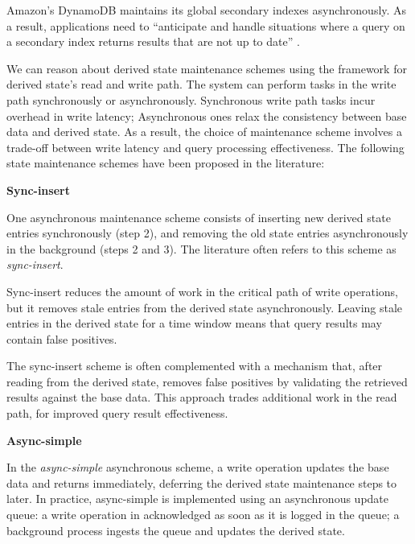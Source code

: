 Amazon's DynamoDB maintains its global secondary indexes asynchronously.
As a result, applications need to ``anticipate and handle situations where a query on a secondary index returns results that are
not up to date'' \cite{dynamodb:async}.

We can reason about derived state maintenance schemes using the framework for derived state's read and write path.
The system can perform tasks in the write path synchronously or asynchronously.
Synchronous write path tasks incur overhead in write latency;
Asynchronous ones relax the consistency between base data and derived state.
As a result, the choice of maintenance scheme involves a trade-off between write latency and query processing effectiveness.
The following state maintenance schemes have been proposed in the literature:





\bigskip
\noindent
\textbf{Sync-insert}

\noindent
One asynchronous maintenance scheme consists of inserting new derived state entries synchronously (step 2),
and removing the old state entries asynchronously in the background (steps 2 and 3).
The literature often refers to this scheme as \textit{sync-insert}.

Sync-insert reduces the amount of work in the critical path of write operations,
but it removes stale entries from the derived state asynchronously.
Leaving stale entries in the derived state for a time window means that query results may contain false positives.

The sync-insert scheme is often complemented with a mechanism that,
after reading from the derived state, removes false positives by validating the retrieved results against
the base data.
This approach trades additional work in the read path, for improved query result effectiveness.

\bigskip
\noindent
\textbf{Async-simple}

\noindent
In the \textit{async-simple} asynchronous scheme,
a write operation updates the base data and returns immediately,
deferring the derived state maintenance steps to later.
In practice, async-simple is implemented using an asynchronous update queue:
a write operation in acknowledged as soon as it is logged in the queue;
a background process ingests the queue and updates the derived state.

